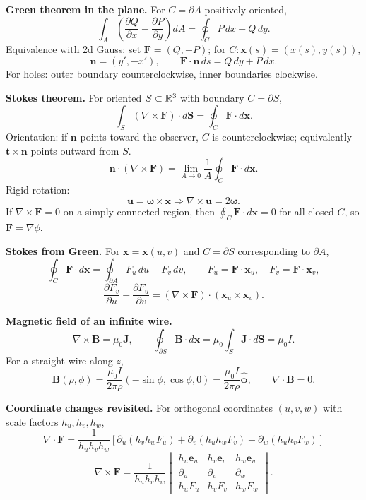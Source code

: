 \noindent\textbf{Green theorem in the plane.}
For $C=\partial A$ positively oriented,
\[
\boxed{\int_A\left(\frac{\partial Q}{\partial x}
-\frac{\partial P}{\partial y}\right)dA
=\oint_C P\,dx+Q\,dy.}
\]
Equivalence with 2d Gauss: set $\mathbf{F}=(Q,-P)$; for
$C:\mathbf{x}(s)=(x(s),y(s))$,
\[
\mathbf{n}=(y',-x'),\qquad
\mathbf{F}\cdot\mathbf{n}\,ds=Q\,dy+P\,dx.
\]
For holes: outer boundary counterclockwise, inner boundaries clockwise.

\noindent\textbf{Stokes theorem.}
For oriented $S\subset\mathbb{R}^3$ with boundary $C=\partial S$,
\[
\boxed{\int_S(\nabla\times\mathbf{F})\cdot d\mathbf{S}
=\oint_C\mathbf{F}\cdot d\mathbf{x}.}
\]
Orientation: if $\mathbf{n}$ points toward the observer, $C$ is counterclockwise;
equivalently $\mathbf{t}\times\mathbf{n}$ points outward from $S$.
\[
\boxed{\mathbf{n}\cdot(\nabla\times\mathbf{F})
=\lim_{A\to0}\frac{1}{A}\oint_C\mathbf{F}\cdot d\mathbf{x}.}
\]
Rigid rotation:
\[
\mathbf{u}=\bm{\omega}\times\mathbf{x}
\Rightarrow \nabla\times\mathbf{u}=2\bm{\omega}.
\]
If $\nabla\times\mathbf{F}=0$ on a simply connected region, then
$\oint_C\mathbf{F}\cdot d\mathbf{x}=0$ for all closed $C$, so
$\mathbf{F}=\nabla\phi$.

\noindent\textbf{Stokes from Green.}
For $\mathbf{x}=\mathbf{x}(u,v)$ and $C=\partial S$ corresponding to $\partial A$,
\[
\oint_C\mathbf{F}\cdot d\mathbf{x}
=\oint_{\partial A}F_u\,du+F_v\,dv,
\qquad
F_u=\mathbf{F}\cdot\mathbf{x}_u,\quad
F_v=\mathbf{F}\cdot\mathbf{x}_v,
\]
\[
\frac{\partial F_v}{\partial u}
-\frac{\partial F_u}{\partial v}
=(\nabla\times\mathbf{F})\cdot(\mathbf{x}_u\times\mathbf{x}_v).
\]

\noindent\textbf{Magnetic field of an infinite wire.}
\[
\nabla\times\mathbf{B}=\mu_0\mathbf{J},\qquad
\oint_{\partial S}\mathbf{B}\cdot d\mathbf{x}
=\mu_0\int_S\mathbf{J}\cdot d\mathbf{S}
=\mu_0 I.
\]
For a straight wire along $z$,
\[
\boxed{\mathbf{B}(\rho,\phi)=
\frac{\mu_0I}{2\pi\rho}(-\sin\phi,\cos\phi,0)
=\frac{\mu_0I}{2\pi\rho}\hat{\bm{\phi}}},\qquad
\nabla\cdot\mathbf{B}=0.
\]

\noindent\textbf{Coordinate changes revisited.}
For orthogonal coordinates $(u,v,w)$ with scale factors $h_u,h_v,h_w$,
\[
\boxed{\nabla\cdot\mathbf{F}
=\frac{1}{h_uh_vh_w}\left[
\partial_u(h_vh_wF_u)
+\partial_v(h_uh_wF_v)
+\partial_w(h_uh_vF_w)\right]}
\]
\[
\boxed{
\nabla\times\mathbf{F}
=\frac{1}{h_uh_vh_w}
\begin{vmatrix}
h_u\mathbf{e}_u & h_v\mathbf{e}_v & h_w\mathbf{e}_w\\
\partial_u & \partial_v & \partial_w\\
h_uF_u & h_vF_v & h_wF_w
\end{vmatrix}.}
\]

